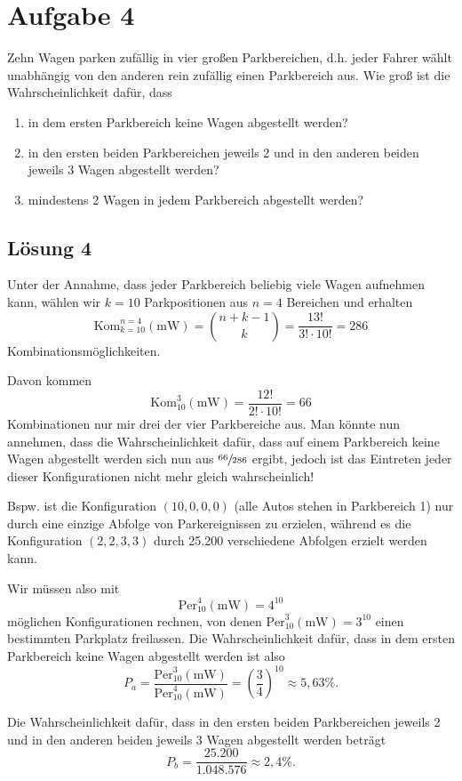 \documentclass[main.tex]{subfiles}
\begin{document}
\section{Aufgabe 4}
Zehn Wagen parken zufällig in vier großen Parkbereichen, d.h. jeder Fahrer wählt unabhängig von den anderen rein zufällig einen Parkbereich aus. Wie groß ist die Wahrscheinlichkeit dafür, dass
\begin{enumerate}
    \item in dem ersten Parkbereich keine Wagen abgestellt werden?
    \item in den ersten beiden Parkbereichen jeweils 2 und in den anderen beiden jeweils 3 Wagen abgestellt werden?
    \item mindestens 2 Wagen in jedem Parkbereich abgestellt werden?
\end{enumerate}

\subsection{Lösung 4}
Unter der Annahme, dass jeder Parkbereich beliebig viele Wagen aufnehmen kann, wählen wir $k=10$ Parkpositionen aus $n=4$ Bereichen und erhalten
$$
    \text{Kom}^{n=4}_{k=10}(\text{mW})
    = \binom{n+k-1}{k}
    = \frac{13!}{3!\cdot 10!}
    = 286
$$
Kombinationsmöglichkeiten.

Davon kommen
$$
    \text{Kom}^{3}_{10}(\text{mW})
    = \frac{12!}{2!\cdot 10!}
    = 66
$$
Kombinationen nur mir drei der vier Parkbereiche aus. Man könnte nun annehmen, dass die Wahrscheinlichkeit dafür, dass auf einem Parkbereich keine Wagen abgestellt werden sich nun aus $\sfrac{66}{286}$ ergibt, jedoch ist das Eintreten jeder dieser Konfigurationen nicht mehr gleich wahrscheinlich!

Bspw. ist die Konfiguration $(10, 0, 0, 0)$ (alle Autos stehen in Parkbereich 1) nur durch eine einzige Abfolge von Parkereignissen zu erzielen, während es die Konfiguration $(2, 2, 3, 3)$ durch 25.200 verschiedene Abfolgen erzielt werden kann.

Wir müssen also mit
$$
    \text{Per}^{4}_{10}(\text{mW})
    = 4^{10}
$$
möglichen Konfigurationen rechnen, von denen $\text{Per}^{3}_{10}(\text{mW}) = 3^{10}$ einen bestimmten Parkplatz freilassen. Die Wahrscheinlichkeit dafür, dass in dem ersten Parkbereich keine Wagen abgestellt werden ist also
$$
    P_a = \frac{\text{Per}^{3}_{10}(\text{mW})}{\text{Per}^{4}_{10}(\text{mW})} = \left(\frac{3}{4}\right)^{10} \approx 5,63\%.
$$

Die Wahrscheinlichkeit dafür, dass in den ersten beiden Parkbereichen jeweils 2 und in den anderen beiden jeweils 3 Wagen abgestellt werden beträgt $$
    P_b = \frac{25.200}{1.048.576} \approx 2,4\%.
$$
\end{document}
